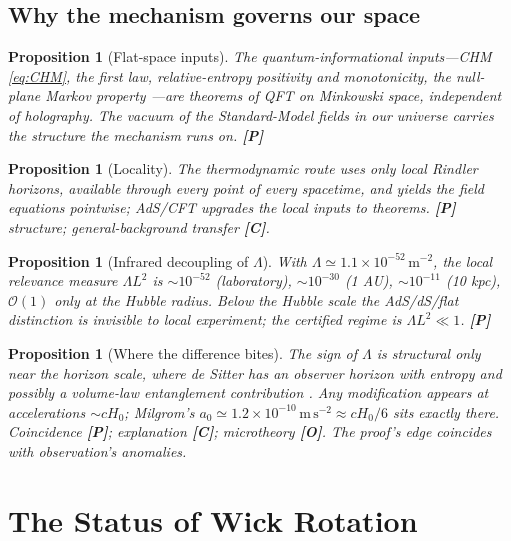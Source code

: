 \documentclass[11pt]{article}
\newtheorem{proposition}[theorem]{Proposition}
\theoremstyle{definition}
\newcommand{\pP}{\textbf{[P]}}
\newcommand{\pC}{\textbf{[C]}}
\newcommand{\pO}{\textbf{[O]}}
\begin{document}
\subsection{Why the mechanism governs our space}
\begin{proposition}[Flat-space inputs]
The quantum-informational inputs---CHM \eqref{eq:CHM}, the first law,
relative-entropy positivity and monotonicity, the null-plane Markov
property \cite{CasiniTesteTorroba2017}---are theorems of QFT on Minkowski
space, independent of holography. The vacuum of the Standard-Model fields
in our universe carries the structure the mechanism runs on. \pP{}
\end{proposition}
\begin{proposition}[Locality]
The thermodynamic route \cite{Jacobson1995,DLP2017} uses only local
Rindler horizons, available through every point of every spacetime, and
yields the field equations pointwise; AdS/CFT upgrades the local inputs to
theorems. \pP{} structure; general-background transfer
\cite{Jacobson2016} \pC{}.
\end{proposition}
\begin{proposition}[Infrared decoupling of $\Lambda$]
With $\Lambda\simeq1.1\times10^{-52}\,\mathrm{m}^{-2}$, the local
relevance measure $\Lambda L^2$ is $\sim10^{-52}$ (laboratory),
$\sim10^{-30}$ (1 AU), $\sim10^{-11}$ (10 kpc), $\mathcal O(1)$ only at
the Hubble radius. Below the Hubble scale the AdS/dS/flat distinction is
invisible to local experiment; the certified regime is
$\Lambda L^2\ll1$. \pP{}
\end{proposition}
\begin{proposition}[Where the difference bites]
The sign of $\Lambda$ is structural only near the horizon scale, where de
Sitter has an observer horizon with entropy \cite{GibbonsHawking1977} and
possibly a volume-law entanglement contribution \cite{Verlinde2017}. Any
modification appears at accelerations $\sim cH_0$; Milgrom's
$a_0\simeq1.2\times10^{-10}\,\mathrm{m\,s^{-2}}\approx cH_0/6$
\cite{Milgrom1983} sits exactly there. Coincidence \pP{}; explanation
\pC{}; microtheory \pO{}. The proof's edge coincides with observation's
anomalies.
\end{proposition}

\section{The Status of Wick Rotation}
\label{app:wick}
\end{document}
